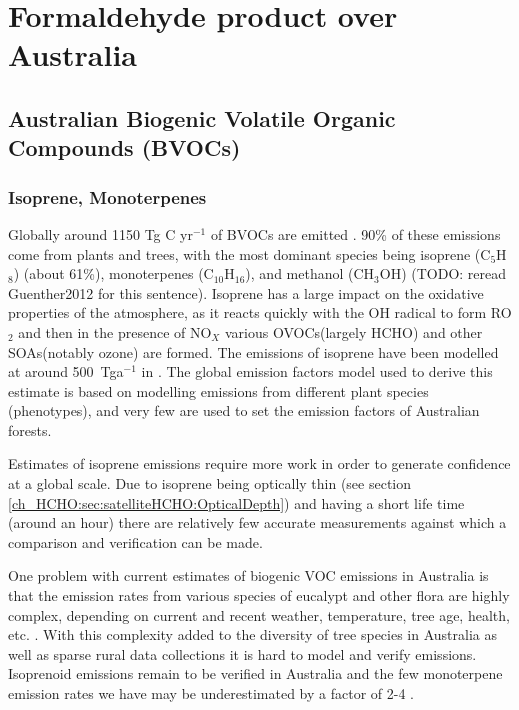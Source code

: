 
\chapter{Formaldehyde product over Australia} %
\label{ch_HCHO} %

\section{Australian Biogenic Volatile Organic Compounds (BVOCs)}
  \label{ch_HCHO:sec:bvoc}

  \subsection{Isoprene, Monoterpenes}
  
    Globally around 1150 Tg C yr$^{-1}$ of BVOCs are emitted \citep{Guenther1995}.
    90\% of these emissions come from plants and trees, with the most dominant species being isoprene (C$_5$H$_8$) (about 61\%), monoterpenes (C$_10$H$_16$), and methanol (CH$_3$OH) \citep{Guenther2012, Lathiere2006} (TODO: reread Guenther2012 for this sentence).
    Isoprene has a large impact on the oxidative properties of the atmosphere, as it reacts quickly with the OH radical to form RO$_2$ and then in the presence of NO$_X$ various OVOCs(largely HCHO) and other SOAs(notably ozone) are formed. 
    The emissions of isoprene have been modelled at around 500~Tga$^{-1}$ in \citet{Guenther1995}.
    The global emission factors model used to derive this estimate is based on modelling emissions from different plant species (phenotypes), and very few are used to set the emission factors of Australian forests.
    
    Estimates of isoprene emissions require more work in order to generate confidence at a global scale.
    Due to isoprene being optically thin (see section \ref{ch_HCHO:sec:satelliteHCHO:OpticalDepth}) and having a short life time (around an hour) there are relatively few accurate measurements against which a comparison and verification can be made.
    
    One problem with current estimates of biogenic VOC emissions in Australia is that the emission rates from various species of eucalypt and other flora are highly complex, depending on current and recent weather, temperature, tree age, health, etc. \citep{Guenther2012}. 
    With this complexity added to the diversity of tree species in Australia as well as sparse rural data collections it is hard to model and verify emissions.
    Isoprenoid emissions remain to be verified in Australia and the few monoterpene emission rates we have may be underestimated by a factor of 2-4 \citep{Winters2009}.
  
